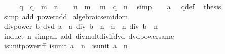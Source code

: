 \begin{isabellebody}
\ {\isacharminus}{\kern0pt}\isanewline
\ \ \isamarkupfalse%
\ q\ \ {\isachardoublequoteopen}q\ {\isacharequal}{\kern0pt}\ m\ {\isacharminus}{\kern0pt}\ n{\isachardoublequoteclose}\isanewline
\ \ \isamarkupfalse%
\ {\isacartoucheopen}n\ {\isasymle}\ m{\isacartoucheclose}\ \isamarkupfalse%
\ {\isachardoublequoteopen}m\ {\isacharequal}{\kern0pt}\ q\ {\isacharplus}{\kern0pt}\ n{\isachardoublequoteclose}\ \isamarkupfalse%
\ simp\isanewline
\ \ \isamarkupfalse%
\ {\isacartoucheopen}a\ {\isasymnoteq}\ {}{\isacartoucheclose}\ q{\isacharunderscore}{\kern0pt}def\ \isamarkupfalse%
\ {\isacharquery}{\kern0pt}thesis\isanewline
\ \ \ \ \isamarkupfalse%
\ {\isacharparenleft}{\kern0pt}simp\ add{\isacharcolon}{\kern0pt}\ power{\isacharunderscore}{\kern0pt}add{\isacharparenright}{\kern0pt}\isanewline
{}\isamarkupfalse%
%
\endisatagproof
{\isafoldproof}%
%
\isadelimproof
\isanewline
%
\endisadelimproof
\isanewline
{}\isamarkupfalse%
\isanewline
\isanewline
{}\isamarkupfalse%
\ algebraic{\isacharunderscore}{\kern0pt}semidom\isanewline
{}\isanewline
\isanewline
{}\isamarkupfalse%
\ div{\isacharunderscore}{\kern0pt}power{\isacharcolon}{\kern0pt}\ {\isachardoublequoteopen}b\ dvd\ a\ {\isasymLongrightarrow}\ {\isacharparenleft}{\kern0pt}a\ div\ b{\isacharparenright}{\kern0pt}\ {\isacharcircum}{\kern0pt}\ n\ {\isacharequal}{\kern0pt}\ a\ {\isacharcircum}{\kern0pt}\ n\ div\ b\ {\isacharcircum}{\kern0pt}\ n{\isachardoublequoteclose}\isanewline
%
\isadelimproof
\ \ %
\endisadelimproof
%
\isatagproof
{}\isamarkupfalse%
\ {\isacharparenleft}{\kern0pt}induct\ n{\isacharparenright}{\kern0pt}\ {\isacharparenleft}{\kern0pt}simp{\isacharunderscore}{\kern0pt}all\ add{\isacharcolon}{\kern0pt}\ div{\isacharunderscore}{\kern0pt}mult{\isacharunderscore}{\kern0pt}div{\isacharunderscore}{\kern0pt}if{\isacharunderscore}{\kern0pt}dvd\ dvd{\isacharunderscore}{\kern0pt}power{\isacharunderscore}{\kern0pt}same{\isacharparenright}{\kern0pt}%
\endisatagproof
{\isafoldproof}%
%
\isadelimproof
\isanewline
%
\endisadelimproof
\isanewline
{}\isamarkupfalse%
\ is{\isacharunderscore}{\kern0pt}unit{\isacharunderscore}{\kern0pt}power{\isacharunderscore}{\kern0pt}iff{\isacharcolon}{\kern0pt}\ {\isachardoublequoteopen}is{\isacharunderscore}{\kern0pt}unit\ {\isacharparenleft}{\kern0pt}a\ {\isacharcircum}{\kern0pt}\ n{\isacharparenright}{\kern0pt}\ {\isasymlongleftrightarrow}\ is{\isacharunderscore}{\kern0pt}unit\ a\ {\isasymor}\ n\ {\isacharequal}{\kern0pt}\ {}{\isachardoublequoteclose}\isanewline

\end{isabellebody}
